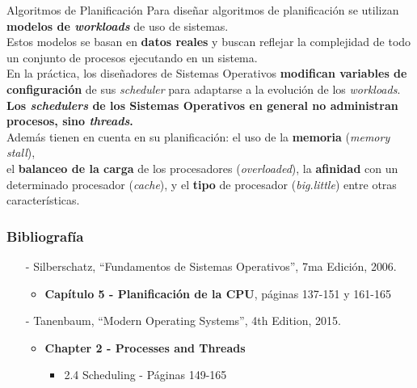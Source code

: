 \documentclass[aspectratio=169]{beamer}
\begin{document}
\begin{frame}{Algoritmos de Planificación}
    Para diseñar algoritmos de planificación se utilizan \textbf{modelos de \emph{workloads}} de uso de sistemas.\\
    \medskip \pause
    Estos modelos se basan en \textbf{datos reales} y buscan reflejar la complejidad de todo un conjunto de procesos ejecutando en un sistema.\\
    \medskip \pause
    En la práctica, los diseñadores de Sistemas Operativos \textbf{modifican variables de configuración} de sus \emph{scheduler} para adaptarse a la evolución de los \emph{workloads}.\\
    \bigskip \pause
    \textcolor{verdeuca}{\textbf{Los \emph{schedulers} de los Sistemas Operativos en general no administran procesos, sino \emph{threads}.}}\\
    \medskip \pause
    Además tienen en cuenta en su planificación: el uso de la \textbf{memoria} (\emph{memory stall}),\\
    el \textbf{balanceo de la carga} de los procesadores (\emph{overloaded}), la \textbf{afinidad} con un determinado procesador (\emph{cache}), y el \textbf{tipo} de procesador (\emph{big.little}) entre otras características.
\end{frame}

\begin{frame}[fragile]
    \frametitle{Bibliografía}
    \begin{itemize}
        \setlength\itemsep{0.5cm}
        \item[-] \small Silberschatz, ``Fundamentos de Sistemas Operativos'', 7ma Edición, 2006.\\
        \begin{itemize}
            \item \textbf{Capítulo 5 - Planificación de la CPU}, páginas 137-151 y 161-165
        \end{itemize}
        \item[-] \small Tanenbaum, ``Modern Operating Systems'', 4th Edition, 2015.\\
        \begin{itemize}
            \item \textbf{Chapter 2 - Processes and Threads}
            \begin{itemize}
                \item 2.4 Scheduling - Páginas 149-165
            \end{itemize}
        \end{itemize}
    \end{itemize}
\end{frame}
\end{document}
